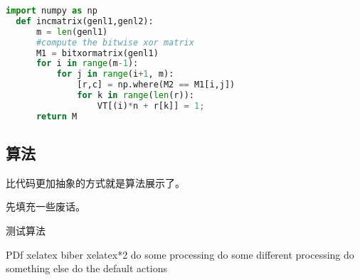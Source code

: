 \documentclass[UTF8,AutoFakeBold,zihao=-4,scheme=chinese]{ctexart}
\begin{document}






\begin{lstlisting}[language=Python,
  caption={Must have Parenthesis},
  label=lst:parenthesis]
  import numpy as np
  def incmatrix(genl1,genl2):
      m = len(genl1)
      #compute the bitwise xor matrix
      M1 = bitxormatrix(genl1)
      for i in range(m-1):
          for j in range(i+1, m):
              [r,c] = np.where(M2 == M1[i,j])
              for k in range(len(r)):
                  VT[(i)*n + r[k]] = 1;
      return M
\end{lstlisting}

\subsection{算法}

比代码更加抽象的方式就是算法展示了。

先填充一些废话。\zhlipsum[7]

\begin{minipage}{0.75\textwidth}

\begin{algorithm}[H]
  \caption{测试算法}
  \label{alg:test}
    \begin{algorithmic}[1]
      \REQUIRE PDf
      \ENSURE xelatex biber xelatex*2
      \STATE do some processing
      \STATE do some different processing
      \STATE do something else
      \ELSE
      \STATE do the default actions
      \ENDIF
    \end{algorithmic}
  \end{algorithm}

\end{minipage}
\newline
\end{document}
